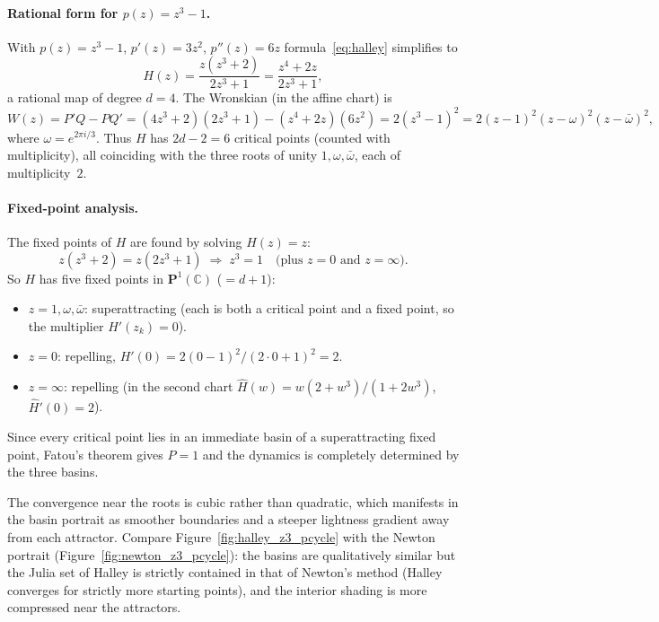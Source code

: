 \documentclass[12pt]{article}
\theoremstyle{definition}
\newcommand{\C}{\mathbb{C}}
\newcommand{\Pone}{\mathbf{P}^1(\C)}
\begin{document}
\paragraph{Rational form for $p(z)=z^3-1$.}
With $p(z)=z^3-1$, $p'(z)=3z^2$, $p''(z)=6z$ formula~\eqref{eq:halley} simplifies to
\begin{equation}\label{eq:halley_z3}
  H(z) = \frac{z(z^3+2)}{2z^3+1}
        = \frac{z^4+2z}{2z^3+1},
\end{equation}
a rational map of degree $d=4$.  The Wronskian (in the affine chart) is
\[
  W(z) = P'Q - PQ'
       = (4z^3+2)(2z^3+1)-(z^4+2z)(6z^2)
       = 2(z^3-1)^2 = 2(z-1)^2(z-\omega)^2(z-\bar\omega)^2,
\]
where $\omega=e^{2\pi i/3}$.  Thus $H$ has $2d-2=6$ critical points
(counted with multiplicity), all coinciding with the three roots of unity
$1,\omega,\bar\omega$, each of multiplicity~$2$.

\paragraph{Fixed-point analysis.}
The fixed points of $H$ are found by solving $H(z)=z$:
\[
  z(z^3+2) = z(2z^3+1) \;\Longrightarrow\; z^3=1
  \quad\text{(plus }z=0\text{ and }z=\infty\text{)}.
\]
So $H$ has five fixed points in $\Pone$ ($=d+1$):
\begin{itemize}
  \item $z=1,\omega,\bar\omega$: superattracting (each is both a critical
        point and a fixed point, so the multiplier $H'(z_k)=0$).
  \item $z=0$: repelling, $H'(0)=2(0-1)^2/(2\cdot 0+1)^2=2$.
  \item $z=\infty$: repelling (in the second chart
        $\hat H(w)=w(2+w^3)/(1+2w^3)$, $\hat H'(0)=2$).
\end{itemize}
Since every critical point lies in an immediate basin of a superattracting
fixed point, Fatou's theorem gives $P=1$ and the dynamics is completely
determined by the three basins.

The convergence near the roots is cubic rather than quadratic, which
manifests in the basin portrait as smoother boundaries and a steeper
lightness gradient away from each attractor.  Compare
Figure~\ref{fig:halley_z3_pcycle} with the Newton portrait
(Figure~\ref{fig:newton_z3_pcycle}): the basins are qualitatively similar
but the Julia set of Halley is strictly contained in that of Newton's
method (Halley converges for strictly more starting points), and the
interior shading is more compressed near the attractors.
\end{document}
